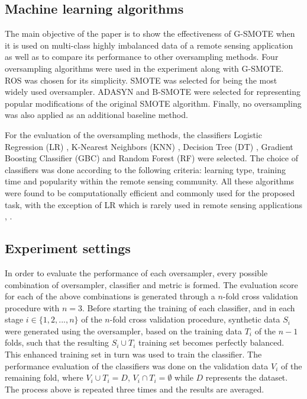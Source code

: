 \documentclass[remotesensing,article,submit,moreauthors,pdftex]{Definitions/mdpi}
\begin{document}
\subsection{Machine learning algorithms}

The main objective of the paper is to show the effectiveness of G-SMOTE when it
is used on multi-class highly imbalanced data of a remote sensing application as
well as to compare its performance to other oversampling methods. Four
oversampling algorithms were used in the experiment along with G-SMOTE. ROS was
chosen for its simplicity. SMOTE was selected for being the most widely used
oversampler. ADASYN and B-SMOTE were selected for representing popular
modifications of the original SMOTE algorithm. Finally, no oversampling was also
applied as an additional baseline method.

For the evaluation of the oversampling methods, the classifiers Logistic
Regression (LR) \cite{McCullagh1989}, K-Nearest Neighbors (KNN)
\cite{Cover1967}, Decision Tree (DT) \cite{Salzberg1994}, Gradient
Boosting Classifier (GBC) \cite{Friedman2001} and Random Forest (RF)
\cite{Liaw2002} were selected. The choice of classifiers was done according
to the following criteria: learning type, training time and popularity within
the remote sensing community. All these algorithms were found to be
computationally efficient and commonly used for the proposed task, with the
exception of LR which is rarely used in remote sensing applications
\cite{Khatami2016}, \cite{Maxwell2018}.

\subsection{Experiment settings}

In order to evaluate the performance of each oversampler, every possible
combination of oversampler, classifier and metric is formed. The evaluation
score for each of the above combinations is generated through a \( n \)-fold
cross validation procedure with \( n = 3 \). Before starting the training of
each classifier, and in each stage \(i \in \{1, 2 ,... , n \} \) of the \( n
\)-fold cross validation procedure, synthetic data \( S_{i} \) were generated
using the oversampler, based on the training data \(T_{i} \) of the \( n - 1 \)
folds, such that the resulting \(S_{i} \cup T_{i} \) training set becomes
perfectly balanced. This enhanced training set in turn was used to train the
classifier. The performance evaluation of the classifiers was done on the
validation data \( V_{i} \) of the remaining fold, where \(V_{i} \cup T_{i} = D
\), \(V_{i} \cap T_{i} = \emptyset \) while \( D \) represents the dataset. The
process above is repeated three times and the results are averaged.
\end{document}
